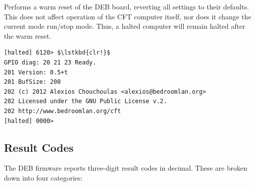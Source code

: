 \begin{description}
\item{\bfseries{}} Performs a warm reset of the \gls{DEB} board,
  reverting all settings to their defaults. This does not affect
  operation of the CFT computer itself, nor does it change the current
  mode run/stop mode. Thus, a halted computer will remain halted after
  the warm reset.

{\small
\begin{lstlisting}[style=deb]
[halted] 6120> $\lstkbd{clr!}$
GPIO diag: 20 21 23 Ready.
201 Version: 0.5+t
201 BufSize: 200
202 (c) 2012 Alexios Chouchoulas <alexios@bedroomlan.org>
202 Licensed under the GNU Public License v.2.
202 http://www.bedroomlan.org/cft
[halted] 0000>
\end{lstlisting}
}

\end{description}

\subsection{Result Codes}

The \gls{DEB} firmware reports three-digit result codes in
decimal. These are broken down into four categories:

